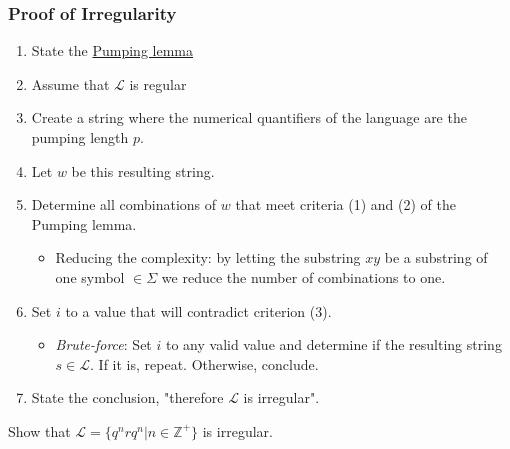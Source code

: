 \subsubsection{Proof of Irregularity}

\begin{enumerate}
    \item State the \hyperref[pumping_lemma_defn]{Pumping lemma}
    \item Assume that $\mathcal{L}$ is regular
    \item Create a string where the numerical quantifiers of the language are the pumping length $p$.
    \item Let $w$ be this resulting string. 
    \item Determine all combinations of $w$ that meet criteria (1) and (2) of the Pumping lemma.
    \begin{itemize}
        \item Reducing the complexity: by letting the substring $xy$ be a substring of one symbol $\in \Sigma$ we reduce the number of combinations to one.
    \end{itemize}
    \item Set $i$ to a value that will contradict criterion (3). 
    \begin{itemize}
        \item \textit{Brute-force}: Set $i$ to any valid value and determine if the resulting string $s\in \mathcal{L}$. If it is, repeat. Otherwise, conclude. 
    \end{itemize}
    \item State the conclusion, "therefore $\mathcal{L}$ is irregular".
\end{enumerate}

\begin{ex}
    Show that $\mathcal{L}=\{q^nrq^n|n\in\mathbb{Z^+}\}$ is irregular.
\end{ex}

